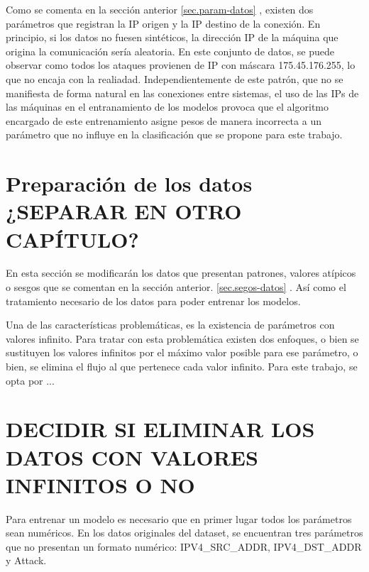Como se comenta en la sección anterior \ref{sec.param-datos} , existen dos parámetros que registran la IP origen y la IP destino de la conexión. En principio, si los datos no fuesen sintéticos, la dirección IP de la máquina que origina la comunicación sería aleatoria. En este conjunto de datos, se puede observar como todos los ataques provienen de IP con máscara 175.45.176.255, lo que no encaja con la realiadad. Independientemente de este patrón, que no se manifiesta de forma natural en las conexiones entre sistemas, el uso de las IPs de las máquinas en el entranamiento de los modelos provoca que el algoritmo encargado de este entrenamiento asigne pesos de manera incorrecta a un parámetro que no influye en la clasificación que se propone para este trabajo.



\section{Preparación de los datos ¿SEPARAR EN OTRO CAPÍTULO?}\label{sec.prep-datos}
En esta sección se modificarán los datos que presentan patrones, valores atípicos o sesgos que se comentan en la sección anterior.  \ref{sec.segos-datos} . Así como el tratamiento necesario de los datos para poder entrenar los modelos.

Una de las características problemáticas, es la existencia de parámetros con valores infinito. Para tratar con esta problemática existen dos enfoques, o bien se sustituyen los valores infinitos por el máximo valor posible para ese parámetro, o bien, se elimina el flujo al que pertenece cada valor infinito. Para este trabajo, se opta por ...
\section{DECIDIR SI ELIMINAR LOS DATOS CON VALORES INFINITOS O NO}

Para entrenar un modelo es necesario que en primer lugar todos los parámetros sean numéricos. En los datos originales del dataset, se encuentran tres parámetros que no presentan un formato numérico: IPV4\_SRC\_ADDR, IPV4\_DST\_ADDR y Attack.

